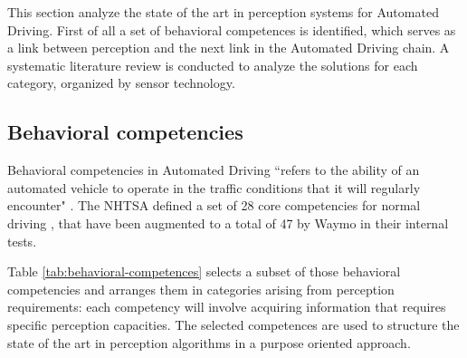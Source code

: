 
This section analyze the state of the art in perception systems for Automated
Driving. First of all a set of behavioral competences is identified, which
serves as a link between perception and the next link in the Automated
Driving chain. A systematic literature review is conducted to analyze the 
solutions for each category, organized by sensor technology.

\subsection{Behavioral competencies}

Behavioral competencies in Automated Driving ``refers to the ability of an 
automated vehicle to operate in the traffic conditions that it will regularly
encounter" \cite{Nowakowski2015}. The NHTSA defined a set of 28 core 
competencies for normal driving \cite{NHTSA2016}, that have been augmented to a 
total of 47 by Waymo \cite{Waymo2017} in their internal tests.

Table \ref{tab:behavioral-competences} selects a subset of those behavioral
competencies and arranges them in categories arising from perception 
requirements: each competency will involve acquiring information that requires
specific perception capacities. 
The selected competences are used to structure the state of the art in
perception algorithms in a purpose oriented approach.

